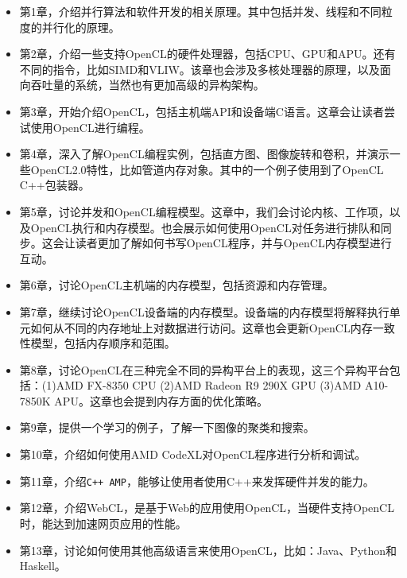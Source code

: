 \begin{itemize}
\item 第1章，介绍并行算法和软件开发的相关原理。其中包括并发、线程和不同粒度的并行化的原理。
\item 第2章，介绍一些支持OpenCL的硬件处理器，包括CPU、GPU和APU。还有不同的指令，比如SIMD和VLIW。该章也会涉及多核处理器的原理，以及面向吞吐量的系统，当然也有更加高级的异构架构。
\item 第3章，开始介绍OpenCL，包括主机端API和设备端C语言。这章会让读者尝试使用OpenCL进行编程。
\item 第4章，深入了解OpenCL编程实例，包括直方图、图像旋转和卷积，并演示一些OpenCL2.0特性，比如管道内存对象。其中的一个例子使用到了OpenCL C++包装器。
\item 第5章，讨论并发和OpenCL编程模型。这章中，我们会讨论内核、工作项，以及OpenCL执行和内存模型。也会展示如何使用OpenCL对任务进行排队和同步。这会让读者更加了解如何书写OpenCL程序，并与OpenCL内存模型进行互动。
\item 第6章，讨论OpenCL主机端的内存模型，包括资源和内存管理。
\item 第7章，继续讨论OpenCL设备端的内存模型。设备端的内存模型将解释执行单元如何从不同的内存地址上对数据进行访问。这章也会更新OpenCL内存一致性模型，包括内存顺序和范围。
\item 第8章，讨论OpenCL在三种完全不同的异构平台上的表现，这三个异构平台包括：(1)AMD FX-8350 CPU (2)AMD Radeon R9 290X GPU (3)AMD A10-7850K APU。这章也会提到内存方面的优化策略。
\item 第9章，提供一个学习的例子，了解一下图像的聚类和搜索。
\item 第10章，介绍如何使用AMD CodeXL对OpenCL程序进行分析和调试。
\item 第11章，介绍\texttt{C++ AMP}，能够让使用者使用C++来发挥硬件并发的能力。
\item 第12章，介绍WebCL，是基于Web的应用使用OpenCL，当硬件支持OpenCL时，能达到加速网页应用的性能。
\item 第13章，讨论如何使用其他高级语言来使用OpenCL，比如：Java、Python和Haskell。
\end{itemize}


